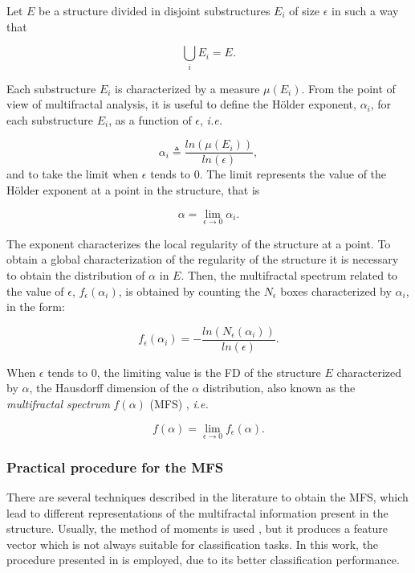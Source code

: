 Let $E$ be a structure divided in disjoint substructures $E_{i}$ of size $\epsilon$ in such a way that 

\begin{equation}
\displaystyle\bigcup_{i}E_{i} = E.
\end{equation}

Each substructure $E_{i}$ is characterized by a measure $\mu(E_{i})$. From the point of view of multifractal analysis, it is useful to define the H\"older exponent, $\alpha_{i}$, for each substructure $E_{i}$, as a function of $\epsilon$, {\em i.e.}


\begin{equation}
\alpha_{i} \triangleq \frac{ln(\mu(E_{i}))}{ln(\epsilon)},
\label{eqn:eqn4}
\end{equation}
\noindent
and to take the limit when $\epsilon$ tends to $0$. The limit represents the value of the H\"older exponent at a point in the structure, that is

\begin{equation}
\alpha = \lim_{\epsilon\to0}{\alpha_{i}}.
\label{eqn:eqn5}
\end{equation}

The exponent characterizes the local regularity of the structure at a point. To obtain a global characterization of the regularity of the structure it is necessary to obtain the distribution of $\alpha$ in $E$. Then, the multifractal spectrum related to the value of $\epsilon$, $f_{\epsilon}(\alpha_{i})$, is obtained by counting the $N_{\epsilon}$ boxes characterized by $\alpha_{i}$, in the form:

\begin{equation}
f_{\epsilon}(\alpha_{i}) = - \frac{ln(N_{\epsilon}(\alpha_{i}))}{ln(\epsilon)}.
\label{eqn:eqn6}
\end{equation}

When $\epsilon$ tends to $0$, the limiting value is the FD of the structure $E$ characterized by $\alpha$, the Hausdorff dimension of the $\alpha$ distribution, also known as the {\em multifractal spectrum} $f(\alpha)$ (MFS) \cite{Silvetti2010}, {\em i.e.}

\begin{equation}
f(\alpha) = \lim_{\epsilon\to0}{f_{\epsilon}(\alpha)}.
\label{eqn:eqn7}
\end{equation}

\subsubsection{Practical procedure for the MFS}
There are several techniques described in the literature to obtain the MFS, which lead to different representations of the multifractal information present in the structure. Usually, the method of moments is used \cite{Mendoza2010,Serrano2012}, but it produces a feature vector which is not always suitable for classification tasks. In this work, the procedure presented in \cite{Xu2009} is employed, due to its better classification performance.

